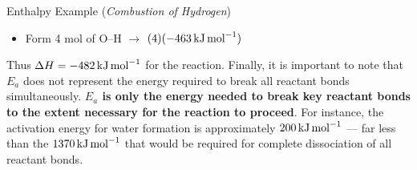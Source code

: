 \documentclass[10pt]{article}
\begin{document}
\begin{core}{Enthalpy Example (\textit{Combustion of Hydrogen})}
\begin{itemize}
        \item Form 4 mol of O--H $\rightarrow$ $(4)(-463\,\text{kJ\,mol}^{-1})$

      \end{itemize}
      
      Thus $\Delta H = -482\,\text{kJ\,mol}^{-1}$ for the reaction. Finally, it is important to note that $E_a$ does not represent the energy required to break all reactant bonds simultaneously. \textbf{$E_a$ is only the energy needed to break key reactant bonds to the extent necessary for the reaction to proceed}. For instance, the activation energy for water formation is approximately $200\,\text{kJ\,mol}^{-1}$ — far less than the $1370\,\text{kJ\,mol}^{-1}$ that would be required for complete dissociation of all reactant bonds.

    \end{core}
\end{document}
